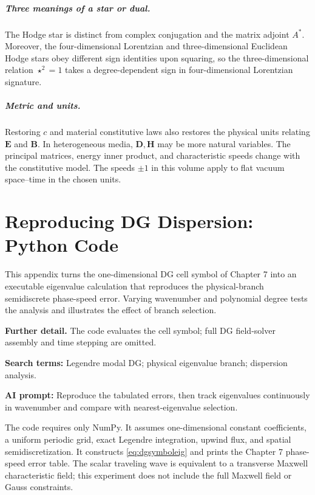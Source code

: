 \documentclass[11pt,openany]{book}
\numberwithin{equation}{chapter}
\theoremstyle{definition}
\theoremstyle{remark}
\newcommand{\studyroute}[3]{%
  \par\smallskip\noindent\textbf{Further detail.} #1\par
  \begingroup\raggedright\noindent\textbf{Search terms:} #2.\par\endgroup
  \noindent\textbf{AI prompt:} #3\par
}
\begin{document}
\paragraph{Three meanings of a star or dual.}
The Hodge star is distinct from complex conjugation and the matrix adjoint $A^*$.
Moreover, the four-dimensional Lorentzian and three-dimensional Euclidean Hodge stars obey different sign identities upon squaring, so the three-dimensional relation $\star^2=1$ takes a degree-dependent sign in four-dimensional Lorentzian signature.

\paragraph{Metric and units.}
Restoring $c$ and material constitutive laws also restores the physical units relating $\bm E$ and $\bm B$.
In heterogeneous media, $\bm D,\bm H$ may be more natural variables.
The principal matrices, energy inner product, and characteristic speeds change with the constitutive model.
The speeds $\pm1$ in this volume apply to flat vacuum space--time in the chosen units.

\chapter{Reproducing DG Dispersion: Python Code}
\begin{chaptersummary}
This appendix turns the one-dimensional DG cell symbol of Chapter 7 into an executable eigenvalue calculation that reproduces the physical-branch semidiscrete phase-speed error.
Varying wavenumber and polynomial degree tests the analysis and illustrates the effect of branch selection.
\end{chaptersummary}
\studyroute{The code evaluates the cell symbol; full DG field-solver assembly and time stepping are omitted.}{Legendre modal DG; physical eigenvalue branch; dispersion analysis}{Reproduce the tabulated errors, then track eigenvalues continuously in wavenumber and compare with nearest-eigenvalue selection.}
The code requires only NumPy.
It assumes one-dimensional constant coefficients, a uniform periodic grid, exact Legendre integration, upwind flux, and spatial semidiscretization.
It constructs \eqref{eq:dgsymboleig} and prints the Chapter 7 phase-speed error table.
The scalar traveling wave is equivalent to a transverse Maxwell characteristic field;
this experiment does not include the full Maxwell field or Gauss constraints.
\end{document}
